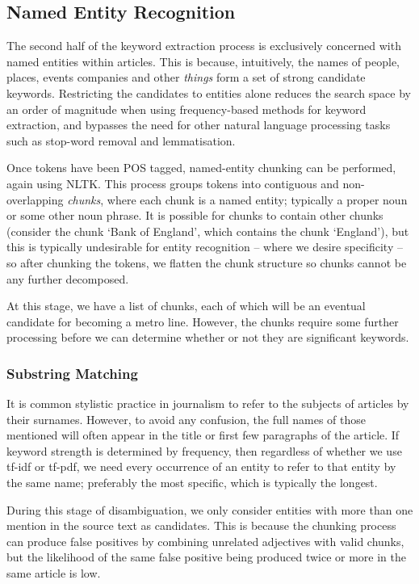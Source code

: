 \subsection{Named Entity Recognition}

The second half of the keyword extraction process is exclusively concerned with named entities within articles. This is because, intuitively, the names of people, places, events companies and other \textit{things} form a set of strong candidate keywords. Restricting the candidates to entities alone reduces the search space by an order of magnitude when using frequency-based methods for keyword extraction, and bypasses the need for other natural language processing tasks such as stop-word removal and lemmatisation.

Once tokens have been POS tagged, named-entity chunking can be performed, again using NLTK. This process groups tokens into contiguous and non-overlapping \textit{chunks}, where each chunk is a named entity; typically a proper noun or some other noun phrase. It is possible for chunks to contain other chunks (consider the chunk `Bank of England', which contains the chunk `England'), but this is typically undesirable for entity recognition -- where we desire specificity -- so after chunking the tokens, we flatten the chunk structure so chunks cannot be any further decomposed.

At this stage, we have a list of chunks, each of which will be an eventual candidate for becoming a metro line. However, the chunks require some further processing before we can determine whether or not they are significant keywords.

\subsubsection{Substring Matching}
It is common stylistic practice in journalism to refer to the subjects of articles by their surnames. However, to avoid any confusion, the full names of those mentioned will often appear in the title or first few paragraphs of the article. If keyword strength is determined by frequency, then regardless of whether we use tf-idf or tf-pdf, we need every occurrence of an entity to refer to that entity by the same name; preferably the most specific, which is typically the longest.

During this stage of disambiguation, we only consider entities with more than one mention in the source text as candidates. This is because the chunking process can produce false positives by combining unrelated adjectives with valid chunks, but the likelihood of the same false positive being produced twice or more in the same article is low.

